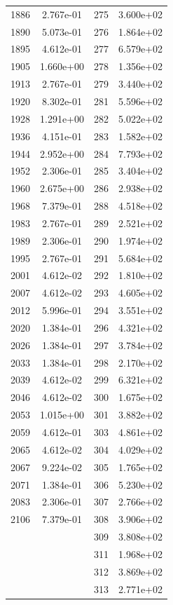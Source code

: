 \documentclass[12pt]{article}
\begin{document}
\begin{longtable}{@{}cccc@{}}
1886 & 2.767e-01 & 275 & 3.600e+02 \\
1890 & 5.073e-01 & 276 & 1.864e+02 \\
1895 & 4.612e-01 & 277 & 6.579e+02 \\
1905 & 1.660e+00 & 278 & 1.356e+02 \\
1913 & 2.767e-01 & 279 & 3.440e+02 \\
1920 & 8.302e-01 & 281 & 5.596e+02 \\
1928 & 1.291e+00 & 282 & 5.022e+02 \\
1936 & 4.151e-01 & 283 & 1.582e+02 \\
1944 & 2.952e+00 & 284 & 7.793e+02 \\
1952 & 2.306e-01 & 285 & 3.404e+02 \\
1960 & 2.675e+00 & 286 & 2.938e+02 \\
1968 & 7.379e-01 & 288 & 4.518e+02 \\
1983 & 2.767e-01 & 289 & 2.521e+02 \\
1989 & 2.306e-01 & 290 & 1.974e+02 \\
1995 & 2.767e-01 & 291 & 5.684e+02 \\
2001 & 4.612e-02 & 292 & 1.810e+02 \\
2007 & 4.612e-02 & 293 & 4.605e+02 \\
2012 & 5.996e-01 & 294 & 3.551e+02 \\
2020 & 1.384e-01 & 296 & 4.321e+02 \\
2026 & 1.384e-01 & 297 & 3.784e+02 \\
2033 & 1.384e-01 & 298 & 2.170e+02 \\
2039 & 4.612e-02 & 299 & 6.321e+02 \\
2046 & 4.612e-02 & 300 & 1.675e+02 \\
2053 & 1.015e+00 & 301 & 3.882e+02 \\
2059 & 4.612e-01 & 303 & 4.861e+02 \\
2065 & 4.612e-02 & 304 & 4.029e+02 \\
2067 & 9.224e-02 & 305 & 1.765e+02 \\
2071 & 1.384e-01 & 306 & 5.230e+02 \\
2083 & 2.306e-01 & 307 & 2.766e+02 \\
2106 & 7.379e-01 & 308 & 3.906e+02 \\
 &  & 309 & 3.808e+02 \\
 &  & 311 & 1.968e+02 \\
 &  & 312 & 3.869e+02 \\
 &  & 313 & 2.771e+02 \\

\end{longtable}
\end{document}
